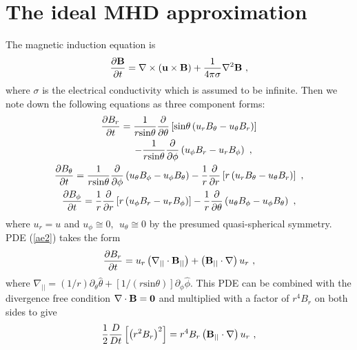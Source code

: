 \documentclass[fleqn,usenatbib]{mnras}
\begin{document}

\appendix
\section{The ideal MHD approximation}
\label{a1}
The magnetic induction equation is
\begin{gather}
\frac{\partial \bf{B}}{\partial t}=\nabla\times \left(\bf{u}\times\bf{B}\right)+\frac{1}{4\pi\sigma}\nabla^{2} \bf{B}\ ,
\end{gather}
where $\sigma$ is the electrical conductivity which is assumed to be infinite. Then we note down the following equations as three component forms:
\begin{gather}
\frac{\partial B_{r}}{\partial t}=\frac{1}{r\mathrm{sin}\theta}\frac{\partial}{\partial\theta}\left[\mathrm{sin}\theta \left(u_{r}B_{\theta}-u_{\theta}B_{r}\right)\right]\notag \\
\quad \quad \quad -\frac{1}{r\mathrm{sin}\theta}\frac{\partial}{\partial\phi}\left(u_{\phi}B_{r}-u_{r}B_{\phi}\right)\ ,\label{ae2}\\
\frac{\partial B_{\theta}}{\partial t}=\frac{1}{r\mathrm{sin}\theta}\frac{\partial}{\partial\phi}\left(u_{\theta}B_{\phi}-u_{\phi}B_{\theta}\right)-\frac{1}{r}\frac{\partial}{\partial r}\left[r\left(u_{r}B_{\theta}-u_{\theta}B_{r}\right)\right]\ ,\label{ae3}\\
\frac{\partial B_{\phi}}{\partial t}=\frac{1}{r}\frac{\partial}{\partial r}\left[r\left(u_{\phi}B_{r}-u_{r}B_{\phi}\right)\right]-\frac{1}{r}\frac{\partial}{\partial\theta}\left(u_{\theta}B_{\phi}-u_{\phi}B_{\theta}\right)\ ,\label{ae4}
\end{gather}
where $u_{r}=u$ and $u_{\phi}\cong 0, \ \ u_{\theta}\cong 0$ by the presumed quasi-spherical symmetry.
PDE (\ref{ae2}) takes the form
\begin{gather}
\frac{\partial B_{r}}{\partial t}=u_{r}\left(\nabla_{||}\cdot \bf{B_{||}}\right)+\left(\bf{B_{||}}\cdot\nabla\right)u_{r}\ ,
\end{gather}
where $\nabla_{||}=\left(1/r\right)\partial_{\theta}\widehat{\theta}+\left[1/\left(r\mathrm{sin}\theta\right)\right]\partial_{\phi}\widehat{\phi}$. 
This PDE can be combined with the divergence free condition $\nabla\cdot \bf{B}=0$ and multiplied with a factor of $r^{4}B_{r}$ on both sides to give
\begin{equation}
\frac{1}{2}\frac{D}{Dt}\left[\left( r^{2}B_{r}\right)^{2}\right]=r^{4}B_{r}\left(\bf{B_{||}}\cdot\nabla\right)u_{r}\ ,
\end{equation}
\end{document}

